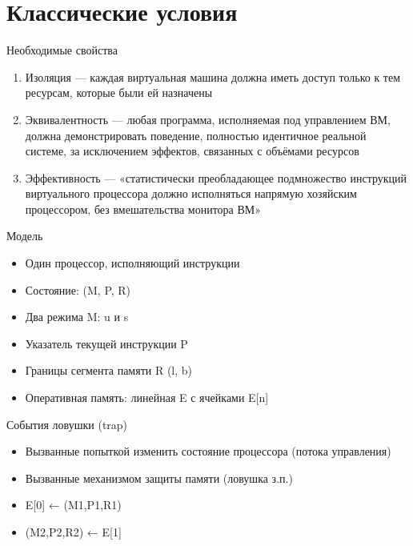 \documentclass{beamer}
\begin{document}
\section{Классические условия}

\begin{frame}{Необходимые свойства}

\begin{enumerate}
\item Изоляция — каждая виртуальная машина должна иметь доступ только к тем ресурсам, которые были ей назначены
\item Эквивалентность — любая программа, исполняемая под управлением ВМ, должна демонстрировать поведение, полностью идентичное реальной системе, за исключением эффектов, связанных с объёмами ресурсов
\item Эффективность — «статистически преобладающее подмножество инструкций виртуального процессора должно исполняться напрямую хозяйским процессором, без вмешательства монитора ВМ»
\end{enumerate}

\end{frame}

\begin{frame}{Модель}

\begin{itemize}
\item Один процессор, исполняющий инструкции
\item Состояние: (M, P, R)
\item Два режима M: u и s
\item Указатель текущей инструкции P
\item Границы сегмента памяти R (l, b)
\item Оперативная память: линейная E с ячейками E[n]
\end{itemize}

\end{frame}

\begin{frame}{События ловушки (trap)}
\begin{itemize}
\item Вызванные попыткой изменить состояние
процессора (потока управления)
\item Вызванные механизмом защиты памяти (ловушка з.п.)

\item E[0] ← (M1,P1,R1)
\item (M2,P2,R2) ← E[1]
\end{itemize}

\end{frame}
\end{document}
